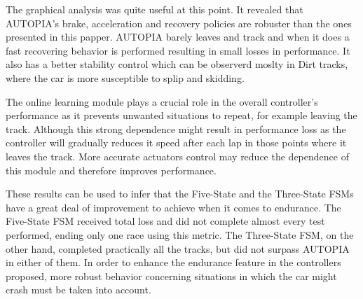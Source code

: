 	The graphical analysis was quite useful at this point. It revealed that AUTOPIA's brake, acceleration and recovery policies are robuster than the ones presented in this papper. AUTOPIA barely leaves and track and when it does a fast recovering behavior is performed  resulting in small losses in performance. It also has a better stability control which can be observerd moslty in Dirt tracks, where the car is more susceptible to splip and skidding.
	
	The online learning module plays a crucial role in the overall controller's performance as it prevents unwanted situations to repeat, for example leaving the track. Although this strong dependence might result in performance loss as the controller will gradually reduces it speed after each lap in those points where it leaves the track. More accurate actuators control may reduce the dependence of this module and therefore improves performance.
	
	These results can be used to infer that the Five-State and the Three-State FSMs have a great deal of improvement to achieve when it comes to endurance. The Five-State FSM received total loss and did not complete almost every test performed, ending only one race using this metric. The Three-State FSM, on the other hand, completed practically all the tracks, but did not surpass AUTOPIA in either of them. In order to enhance the endurance feature in the controllers proposed, more robust behavior concerning situations in which the car might crash must be taken into account.	
	
	
